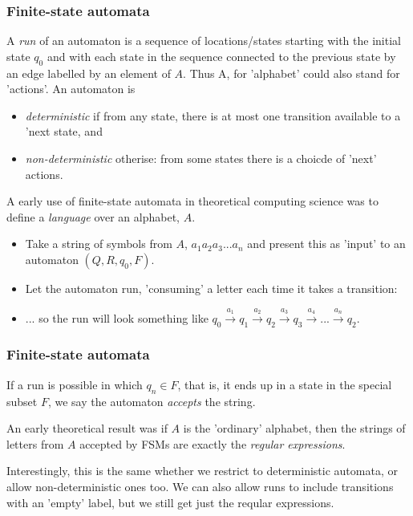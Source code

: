 \documentclass[10pt, hyperref={pdfpagelabels=false}]{beamer}
\begin{document}
\begin{frame}
\frametitle{Finite-state automata}
A \emph{run} of an automaton is a sequence of locations/states starting with the initial state $q_0$ and with each state in the sequence connected to the previous state by an edge labelled by an element of $A$. Thus A, for 'alphabet' could also stand for 'actions'. An automaton is
\begin{itemize}
\item \emph{deterministic} if from any state, there is at most one transition available to a 'next state, and
\item \emph{non-deterministic} otherise: from some states there is a choicde of 'next' actions.
\end{itemize}

A early use of finite-state automata in theoretical computing science was to define a \emph{language} over an alphabet, $A$. 
\begin{itemize}
\item Take a string of symbols from $A$, $a_1a_2a_3...a_n$ and present this as 'input' to an automaton $(Q, R, q_0, F)$. 
\item Let the automaton run, 'consuming' a letter each time it takes a transition: 
\item ... so the run will look something like $q_0 \stackrel{a_1}{\longrightarrow} q_1\stackrel{a_2}{\longrightarrow} q_2\stackrel{a_3}{\longrightarrow}q_3\stackrel{a_4}{\longrightarrow} ... \stackrel{a_n}{\longrightarrow} q_2$. 
\end{itemize}
\end{frame}

\begin{frame}
\frametitle{Finite-state automata}
If a run is possible in which $q_n \in F$, that is, it ends up in a state in the special subset $F$, we say the automaton \emph{accepts} the string.

An early theoretical result was if $A$ is the 'ordinary' alphabet, then the strings of letters from $A$ accepted by FSMs are exactly the \emph{regular expressions}.

Interestingly, this is the same whether we restrict to deterministic automata, or allow non-deterministic ones too. We can also allow runs to include transitions with an 'empty' label, but we still get just the reqular expressions.
\end{frame}
\end{document}

